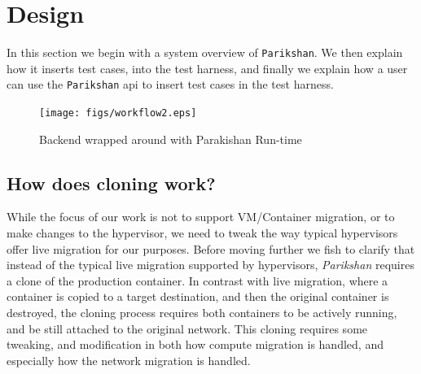 
\section{Design}
\label{sec:design}

In this section we begin with a system overview of \texttt{Parikshan}. 
We then explain how it inserts test cases, into the test harness, and finally we explain how a user can use the \texttt{Parikshan} api to insert test cases in the test harness.

\begin{figure}[t]
  \begin{center}
    \texttt{[image: figs/workflow2.eps]}
    \caption{Backend wrapped around with Parakishan Run-time}
    \label{fig:workflow}
  \end{center}
\end{figure}

\subsection{How does cloning work?}

While the focus of our work is not to support VM/Container migration, or to make changes to the hypervisor, we need to tweak the way typical hypervisors offer live migration for our purposes.
Before moving further we fish to clarify that instead of the typical live migration supported by hypervisors, \textit{Parikshan} requires a clone of the production container. 
In contrast with live migration, where a container is copied to a target destination, and then the original container is destroyed, the cloning process requires both containers to be actively running, and be still attached to the original network.
This cloning requires some tweaking, and modification in both how compute migration is handled, and especially how the network migration is handled. 

